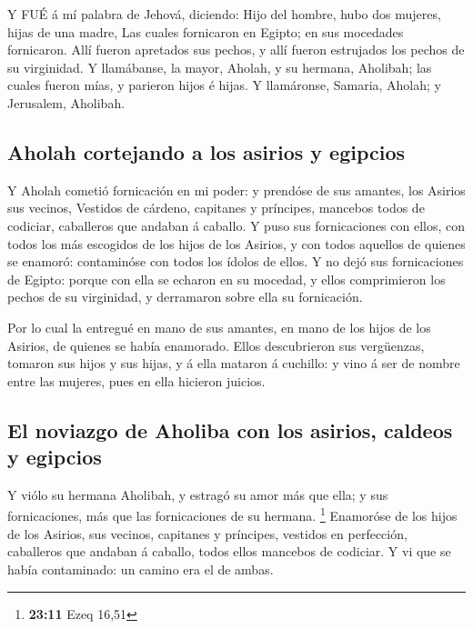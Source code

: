  Y FUÉ á mí palabra de Jehová, diciendo:  Hijo
del hombre, hubo dos mujeres, hijas de una madre,  Las
cuales fornicaron en Egipto; en sus mocedades fornicaron. Allí fueron
apretados sus pechos, y allí fueron estrujados los pechos de su
virginidad.  Y llamábanse, la mayor, Aholah, y su hermana,
Aholibah; las cuales fueron mías, y parieron hijos é hijas. Y
llamáronse, Samaria, Aholah; y Jerusalem, Aholibah.

\hypertarget{aholah-cortejando-a-los-asirios-y-egipcios}{%
\subsection{Aholah cortejando a los asirios y
egipcios}\label{aholah-cortejando-a-los-asirios-y-egipcios}}

 Y Aholah cometió fornicación en mi poder: y prendóse de sus
amantes, los Asirios sus vecinos,  Vestidos de cárdeno,
capitanes y príncipes, mancebos todos de codiciar, caballeros que
andaban á caballo.  Y puso sus fornicaciones con ellos, con
todos los más escogidos de los hijos de los Asirios, y con todos
aquellos de quienes se enamoró: contaminóse con todos los ídolos de
ellos.  Y no dejó sus fornicaciones de Egipto: porque con
ella se echaron en su mocedad, y ellos comprimieron los pechos de su
virginidad, y derramaron sobre ella su fornicación.

 Por lo cual la entregué en mano de sus amantes, en mano de
los hijos de los Asirios, de quienes se había enamorado. 
Ellos descubrieron sus vergüenzas, tomaron sus hijos y sus hijas, y á
ella mataron á cuchillo: y vino á ser de nombre entre las mujeres, pues
en ella hicieron juicios.

\hypertarget{el-noviazgo-de-aholiba-con-los-asirios-caldeos-y-egipcios}{%
\subsection{El noviazgo de Aholiba con los asirios, caldeos y
egipcios}\label{el-noviazgo-de-aholiba-con-los-asirios-caldeos-y-egipcios}}

 Y viólo su hermana Aholibah, y estragó su amor más que
ella; y sus fornicaciones, más que las fornicaciones de su hermana.
\footnote{\textbf{23:11} Ezeq 16,51}  Enamoróse de los
hijos de los Asirios, sus vecinos, capitanes y príncipes, vestidos en
perfección, caballeros que andaban á caballo, todos ellos mancebos de
codiciar.  Y vi que se había contaminado: un camino era el
de ambas.

